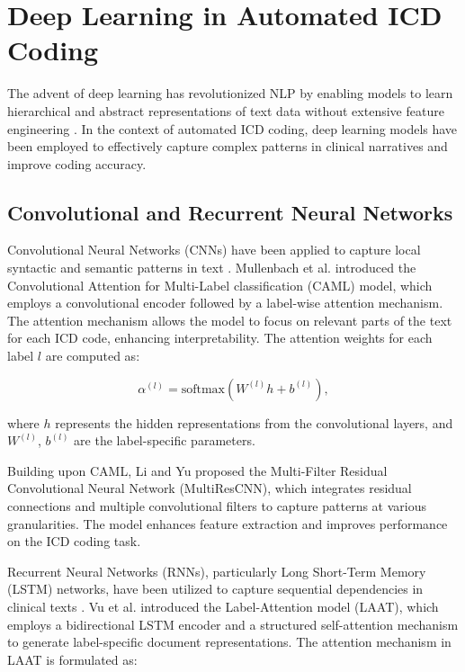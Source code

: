 \documentclass[12pt,a4paper]{report}
\begin{document}
\section{Deep Learning in Automated ICD Coding}

The advent of deep learning has revolutionized NLP by enabling models to learn hierarchical and abstract representations of text data without extensive feature engineering \cite{lecun2015deep}. In the context of automated ICD coding, deep learning models have been employed to effectively capture complex patterns in clinical narratives and improve coding accuracy.

\subsection{Convolutional and Recurrent Neural Networks}

Convolutional Neural Networks (CNNs) have been applied to capture local syntactic and semantic patterns in text \cite{kim2014convolutional}. Mullenbach et al. \cite{mullenbach2018explainable} introduced the Convolutional Attention for Multi-Label classification (CAML) model, which employs a convolutional encoder followed by a label-wise attention mechanism. The attention mechanism allows the model to focus on relevant parts of the text for each ICD code, enhancing interpretability. The attention weights for each label $l$ are computed as:

\begin{equation}
\alpha^{(l)} = \text{softmax}(W^{(l)} h + b^{(l)}),
\end{equation}

where $h$ represents the hidden representations from the convolutional layers, and $W^{(l)}$, $b^{(l)}$ are the label-specific parameters.

Building upon CAML, Li and Yu \cite{li2020multi} proposed the Multi-Filter Residual Convolutional Neural Network (MultiResCNN), which integrates residual connections and multiple convolutional filters to capture patterns at various granularities. The model enhances feature extraction and improves performance on the ICD coding task.

Recurrent Neural Networks (RNNs), particularly Long Short-Term Memory (LSTM) networks, have been utilized to capture sequential dependencies in clinical texts \cite{hochreiter1997long}. Vu et al. \cite{vu2020label} introduced the Label-Attention model (LAAT), which employs a bidirectional LSTM encoder and a structured self-attention mechanism to generate label-specific document representations. The attention mechanism in LAAT is formulated as:
\end{document}
